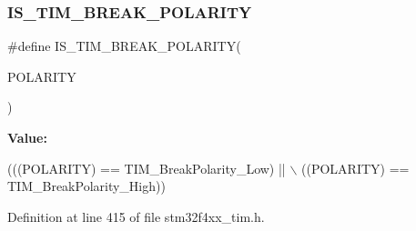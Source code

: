 \subsubsection{\texorpdfstring{I\+S\+\_\+\+T\+I\+M\+\_\+\+B\+R\+E\+A\+K\+\_\+\+P\+O\+L\+A\+R\+I\+TY}{IS\_TIM\_BREAK\_POLARITY}}
{\footnotesize\ttfamily \#define I\+S\+\_\+\+T\+I\+M\+\_\+\+B\+R\+E\+A\+K\+\_\+\+P\+O\+L\+A\+R\+I\+TY(\begin{DoxyParamCaption}\item[{}]{P\+O\+L\+A\+R\+I\+TY }\end{DoxyParamCaption})}

{\bfseries Value\+:}
\begin{DoxyCode}
(((POLARITY) == TIM\_BreakPolarity\_Low) || \(\backslash\)
                                         ((POLARITY) == TIM\_BreakPolarity\_High))
\end{DoxyCode}


Definition at line 415 of file stm32f4xx\+\_\+tim.\+h.

